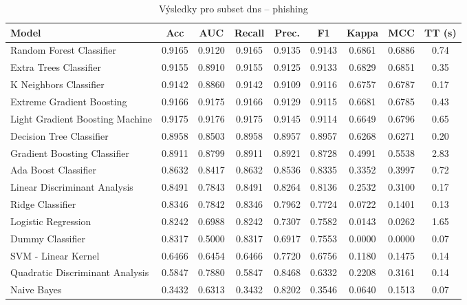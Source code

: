 \begin{table}[H]
  \centering
  \small
  \caption{Výsledky pro subset dns – phishing}
  \begin{tabular}{|l|c|c|c|c|c|c|c|c|}
    \hline
    \textbf{Model} & \textbf{Acc} & \textbf{AUC} & \textbf{Recall} & \textbf{Prec.} & \textbf{F1} & \textbf{Kappa} & \textbf{MCC} & \textbf{TT (s)} \\
    \hline
    Random Forest Classifier & 0.9165 & 0.9120 & 0.9165 & 0.9135 & 0.9143 & 0.6861 & 0.6886 & 0.74 \\
    Extra Trees Classifier & 0.9155 & 0.8910 & 0.9155 & 0.9125 & 0.9133 & 0.6829 & 0.6851 & 0.35 \\
    K Neighbors Classifier & 0.9142 & 0.8860 & 0.9142 & 0.9109 & 0.9116 & 0.6757 & 0.6787 & 0.17 \\
    Extreme Gradient Boosting & 0.9166 & 0.9175 & 0.9166 & 0.9129 & 0.9115 & 0.6681 & 0.6785 & 0.43 \\
    Light Gradient Boosting Machine & 0.9175 & 0.9176 & 0.9175 & 0.9145 & 0.9114 & 0.6649 & 0.6796 & 0.65 \\
    Decision Tree Classifier & 0.8958 & 0.8503 & 0.8958 & 0.8957 & 0.8957 & 0.6268 & 0.6271 & 0.20 \\
    Gradient Boosting Classifier & 0.8911 & 0.8799 & 0.8911 & 0.8921 & 0.8728 & 0.4991 & 0.5538 & 2.83 \\
    Ada Boost Classifier & 0.8632 & 0.8417 & 0.8632 & 0.8536 & 0.8335 & 0.3352 & 0.3997 & 0.72 \\
    Linear Discriminant Analysis & 0.8491 & 0.7843 & 0.8491 & 0.8264 & 0.8136 & 0.2532 & 0.3100 & 0.17 \\
    Ridge Classifier & 0.8346 & 0.7842 & 0.8346 & 0.7962 & 0.7724 & 0.0722 & 0.1401 & 0.13 \\
    Logistic Regression & 0.8242 & 0.6988 & 0.8242 & 0.7307 & 0.7582 & 0.0143 & 0.0262 & 1.65 \\
    Dummy Classifier & 0.8317 & 0.5000 & 0.8317 & 0.6917 & 0.7553 & 0.0000 & 0.0000 & 0.07 \\
    SVM - Linear Kernel & 0.6466 & 0.6454 & 0.6466 & 0.7720 & 0.6756 & 0.1180 & 0.1475 & 0.14 \\
    Quadratic Discriminant Analysis & 0.5847 & 0.7880 & 0.5847 & 0.8468 & 0.6332 & 0.2208 & 0.3161 & 0.14 \\
    Naive Bayes & 0.3432 & 0.6313 & 0.3432 & 0.8202 & 0.3546 & 0.0640 & 0.1513 & 0.07 \\
    \hline
  \end{tabular}
\end{table}
\vspace{0.5cm}

